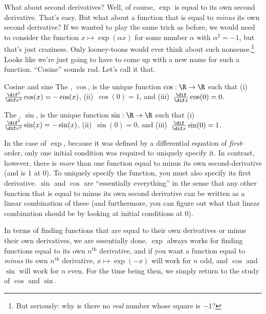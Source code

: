 What about second derivatives?  Well, of course, $\exp$ is equal to its own second derivative.  That's easy.  But what about a function that is equal to \emph{minus} its own second derivative?  If we wanted to play the same trick as before, we would need to consider the function $x\mapsto \exp (\alpha x)$ for some number $\alpha$ with $\alpha ^2=-1$, but that's just craziness.  Only looney-toons would ever think about such nonsense.\footnote{But seriously:  why is there no \emph{real} number whose square is $-1$?}  Looks like we're just going to have to come up with a new name for such a function.  ``Cosine'' sounds rad.  Let's call it that.
\begin{dfn}{Cosine and sine}{}
The , $\cos$\index[notation]{$\cos$}, is the unique function $\cos :\R \rightarrow \R$ such that (i)~$\frac{\dif ^2}{\dif x^2}\cos (x)=-\cos (x)$, (ii)~$\cos (0)=1$, and (iii)~$\frac{\dif}{\dif x}\cos (0)=0$.

The , $\sin$\index[notation]{$\sin$}, is the unique function $\sin :\R \rightarrow \R$ such that (i)~$\frac{\dif ^2}{\dif x^2}\sin (x)=-\sin (x)$, (ii)~$\sin (0)=0$, and (iii)~$\frac{\dif}{\dif x}\sin (0)=1$.
\begin{rmk}
In the case of $\exp$, because it was defined by a differential equation of \emph{first}-order, only one initial condition was required to uniquely specify it.  In contrast, however, there is \emph{more} than one function equal to minus its own second-derivative (and is $1$ at $0$).  To uniquely specify the function, you must also specify its first derivative.  $\sin$ and $\cos$ are ``essentially everything'' in the sense that any other function that is equal to minus its own second derivative can be written as a linear combination of these (and furthermore, you can figure out what that linear combination should be by looking at initial conditions at $0$).
\end{rmk}
\end{dfn}

In terms of finding functions that are equal to their own derivatives or minus their own derivatives, we are essentially done.  $\exp$ always works for finding functions equal to its own $n^{\text{th}}$ derivative, and if you want a function equal to \emph{minus} its own $n^{\text{th}}$ derivative, $x\mapsto \exp (-x)$ will work for $n$ odd, and $\cos$ and $\sin$ will work for $n$ even.  For the time being then, we simply return to the study of $\cos$ and $\sin$.

